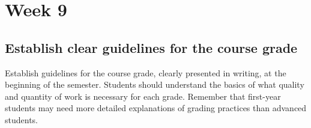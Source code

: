 \section{Week 9}
\label{sec:week-9}

\subsection{Establish clear guidelines for the course grade}
\label{sec:establ-clear-guid}

Establish guidelines for the course grade, clearly presented in writing, at the beginning of the semester. Students should understand the basics of what quality and quantity of work is necessary for each grade. Remember that first-year students may need more detailed explanations of grading practices than advanced students.



